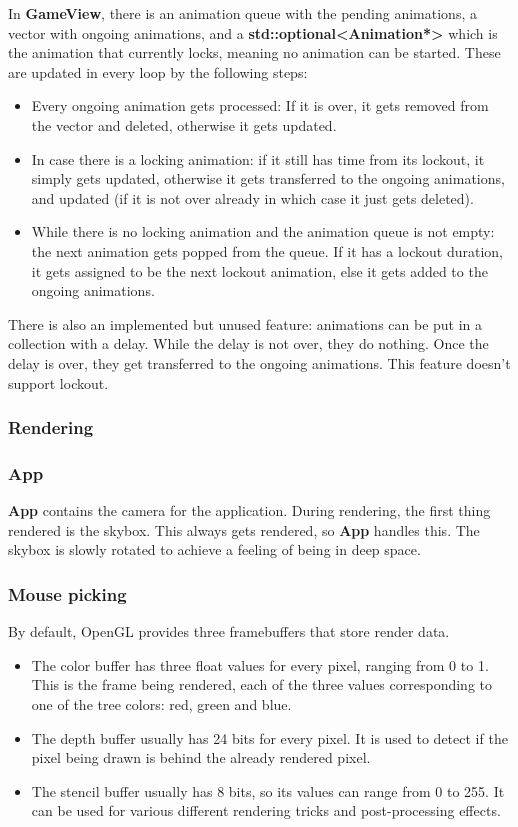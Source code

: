 In \textbf{GameView}, there is an animation queue with the pending animations, a vector with ongoing animations, and a \textbf{std::optional<Animation*>} which is the animation that currently locks, meaning no animation can be started. These are updated in every loop by the following steps:
\begin{itemize}
    \item Every ongoing animation gets processed: If it is over, it gets removed from the vector and deleted, otherwise it gets updated.
    \item In case there is a locking animation: if it still has time from its lockout, it simply gets updated, otherwise it gets transferred to the ongoing animations, and updated (if it is not over already in which case it just gets deleted).
    \item While there is no locking animation and the animation queue is not empty: the next animation gets popped from the queue. If it has a lockout duration, it gets assigned to be the next lockout animation, else it gets added to the ongoing animations.
\end{itemize}

There is also an implemented but unused feature: animations can be put in a collection with a delay. While the delay is not over, they do nothing. Once the delay is over, they get transferred to the ongoing animations. This feature doesn't support lockout.

\subsubsection{Rendering}

\subsubsection*{App}

\textbf{App} contains the camera for the application. During rendering, the first thing rendered is the skybox. This always gets rendered, so \textbf{App} handles this. The skybox is slowly rotated to achieve a feeling of being in deep space.

\subsubsection*{Mouse picking}

By default, OpenGL provides three framebuffers that store render data.
\begin{itemize}
    \item The color buffer has three float values for every pixel, ranging from 0 to 1. This is the frame being rendered, each of the three values corresponding to one of the tree colors: red, green and blue.
    \item The depth buffer usually has 24 bits for every pixel. It is used to detect if the pixel being drawn is behind the already rendered pixel.
    \item The stencil buffer usually has 8 bits, so its values can range from 0 to 255. It can be used for various different rendering tricks and post-processing effects.
\end{itemize}

